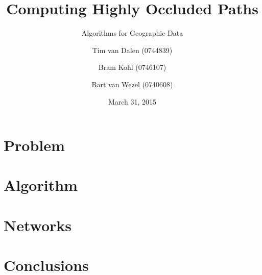 \documentclass[english,aspectratio=43]{beamer}
\title{Computing Highly Occluded Paths}
\subtitle{Algorithms for Geographic Data}
\author[Group 10]{
	Tim van Dalen (0744839)
	\and
	Bram Kohl (0746107)
	\and
	Bart van Wezel (0740608)
}
\institute[TU/e]
{
    WIS\\
	Eindhoven University of Technology
}
\date{March 31, 2015}
\begin{document}
	\begin{frame}
		\titlepage
	\end{frame}

	\section{Problem}
	

	\section{Algorithm}
	

	\section{Networks}
	

	\section{Conclusions}
	

	\begin{frame}{}
	\end{frame}
\end{document}
